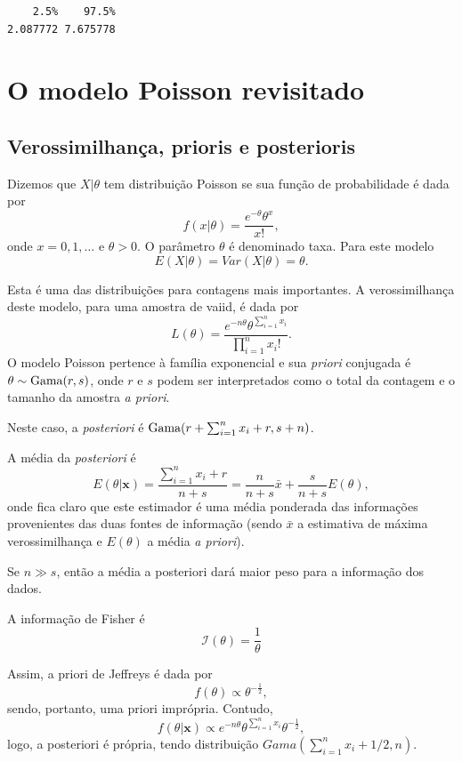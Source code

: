 \documentclass[
  letterpaper,
  DIV=11,
  numbers=noendperiod]{scrreprt}
\theoremstyle{definition}
\theoremstyle{definition}
\theoremstyle{remark}
\begin{document}
\begin{verbatim}
    2.5%    97.5% 
2.087772 7.675778 
\end{verbatim}


\hypertarget{o-modelo-poisson-revisitado}{%
\chapter{O modelo Poisson
revisitado}\label{o-modelo-poisson-revisitado}}

\hypertarget{verossimilhanuxe7a-prioris-e-posterioris}{%
\section{Verossimilhança, prioris e
posterioris}\label{verossimilhanuxe7a-prioris-e-posterioris}}

Dizemos que \(X|\theta\) tem distribuição Poisson se sua função de
probabilidade é dada por \[f(x|\theta)=\frac{e^{-\theta}\theta^x}{x!},\]
onde \(x=0,1,\ldots\) e \(\theta>0\). O parâmetro \(\theta\) é
denominado taxa. Para este modelo \[E(X|\theta)=Var(X|\theta)=\theta.\]

Esta é uma das distribuições para contagens mais importantes. A
verossimilhança deste modelo, para uma amostra de vaiid, é dada por
\[L(\theta)=\frac{e^{-n\theta}\theta^{\sum_{i=1}^{n}x_i}}{\prod_{i=1}^{n}x_i!}.\]
O modelo Poisson pertence à família exponencial e sua \textit{priori}
conjugada é \(\theta\sim\hbox{Gama}(r,s)\), onde \(r\) e \(s\) podem ser
interpretados como o total da contagem e o tamanho da amostra
\textit{a priori}.

Neste caso, a \textit{posteriori} é
\(\hbox{Gama}(r+\sum_{i=1}^n x_i+r, s+n)\).

A média da \textit{posteriori} é
\[E(\theta|\mathbf{x})=\frac{\sum_{i=1}^{n}x_i+r}{n+s}=\frac{n}{n+s}\bar{x}+\frac{s}{n+s}E(\theta),\]
onde fica claro que este estimador é uma média ponderada das informações
provenientes das duas fontes de informação (sendo \(\bar{x}\) a
estimativa de máxima verossimilhança e \(E(\theta)\) a média
\textit{a priori}).

Se \(n\gg s\), então a média a posteriori dará maior peso para a
informação dos dados.

A informação de Fisher é \[\mathcal{I}(\theta)=\frac{1}{\theta}\]

Assim, a priori de Jeffreys é dada por
\[f(\theta)\propto \theta^{-\frac{1}{2}},\] sendo, portanto, uma priori
imprópria. Contudo,
\[f(\theta|\mathbf{x})\propto e^{-n\theta}\theta^{\sum_{i=1}^{n}x_i} \theta^{-\frac{1}{2}},\]
logo, a posteriori é própria, tendo distribuição
\(Gama(\sum_{i=1}^{n}x_i+1/2,n)\).
\end{document}
